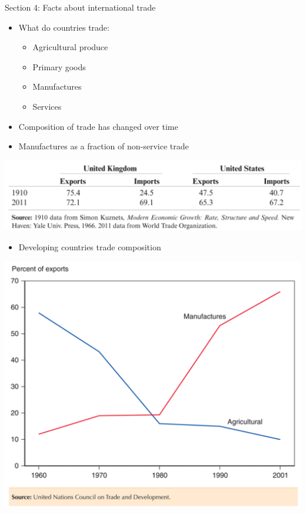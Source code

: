 \documentclass[ignorenonframetext,]{beamer}
\begin{document}
\begin{frame}
    Section 4: Facts about international trade
\end{frame}

\begin{frame}

    \begin{itemize}
        \item What do countries trade:
        \begin{itemize}
            \item Agricultural produce
            \item Primary goods
            \item Manufactures
            \item Services
        \end{itemize}
        \item Composition of trade has changed over time
        \item Manufactures as a fraction of non-service trade
    \end{itemize}
    
    \includegraphics[scale=0.20]{us_uk_merchandise_trade.png}

\end{frame}

\begin{frame}

    \begin{itemize}
        \item Developing countries trade composition 
    \end{itemize}
    
    \includegraphics[scale=0.20]{developing_country_comp_adv.png}

\end{frame}
\end{document}
